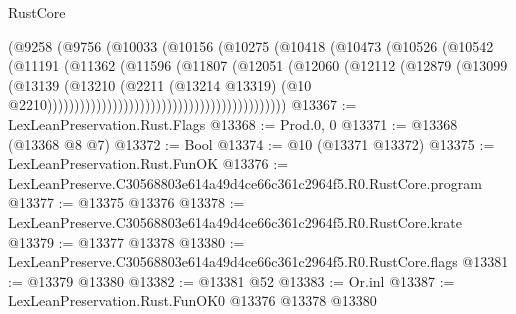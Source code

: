 \begin{lexlean}{RustCore}
\begin{coremodule}
                                                (@9258
                                                  (@9756
                                                    (@10033
                                                      (@10156
                                                        (@10275
                                                          (@10418
                                                            (@10473
                                                              (@10526
                                                                (@10542
                                                                  (@11191
                                                                    (@11362
                                                                      (@11596
                                                                        (@11807
                                                                          (@12051
                                                                            (@12060
                                                                              (@12112
                                                                                (@12879
                                                                                  (@13099
                                                                                    (@13139
                                                                                      (@13210
                                                                                        (@2211
                                                                                          (@13214
                                                                                            @13319)
                                                                                          (@10
                                                                                            @2210))))))))))))))))))))))))))))))))))))))))))))
@13367 := LexLeanPreservation.Rust.Flags
@13368 := Prod.{0, 0}
@13371 := @13368 (@13368 @8 @7)
@13372 := Bool
@13374 := @10 (@13371 @13372)
@13375 := LexLeanPreservation.Rust.FunOK
@13376 := LexLeanPreserve.C30568803e614a49d4ce66c361c2964f5.R0.RustCore.program
@13377 := @13375 @13376
@13378 := LexLeanPreserve.C30568803e614a49d4ce66c361c2964f5.R0.RustCore.krate
@13379 := @13377 @13378
@13380 := LexLeanPreserve.C30568803e614a49d4ce66c361c2964f5.R0.RustCore.flags
@13381 := @13379 @13380
@13382 := @13381 @52
@13383 := Or.inl
@13387 := LexLeanPreservation.Rust.FunOK0 @13376 @13378 @13380

\end{coremodule}
\end{lexlean}
